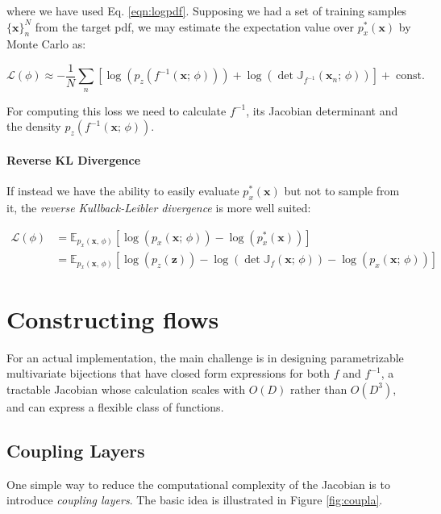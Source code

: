 where we have used Eq. \ref{eqn:logpdf}. Supposing we had a set of training samples $\{\mathbf{x}\}^N_n$ from the target pdf, we may estimate the expectation value over $p_x^*(\mathbf{x})$ by Monte Carlo as:

\[
\mathcal{L}(\phi) \approx -\frac{1}{N} \sum_n [\log(p_z(f^{-1}(\mathbf{x}; \, \phi)))+\log\left(\det\mathbb{J}_{f^{-1}}(\mathbf{x}_n; \, \phi)\right)] +\; \text{const.}
\]

For computing this loss we need to calculate $f^{-1}$, its Jacobian determinant and the density $p_z(f^{-1}(\mathbf{x}; \, \phi))$. 

\paragraph{Reverse KL Divergence} If instead we have the ability to easily evaluate $p_x^*(\mathbf{x})$ but not to sample from it, the \emph{reverse Kullback-Leibler divergence} is more well suited:

\[
\begin{aligned}
    \mathcal{L}(\phi) &= \mathbb{E}_{p_x(\mathbf{x}, \, \phi)}[\log(p_x(\mathbf{x}; \, \phi)) - \log(p_x^*(\mathbf{x}))]\\
    &= \mathbb{E}_{p_x(\mathbf{x}, \, \phi)}[\log(p_z(\mathbf{z}))-\log\left(\det\mathbb{J}_{f}(\mathbf{x}; \, \phi)\right)-\log(p_x(\mathbf{x}; \, \phi))]
\end{aligned}
\]

\section{Constructing flows}
For an actual implementation, the main challenge is in designing parametrizable multivariate bijections that have closed form expressions for both $f$ and $f^{-1}$, a tractable Jacobian whose calculation scales with $O(D)$ rather than $O(D^3)$, and can express a flexible class of functions.

\subsection{Coupling Layers}

One simple way to reduce the computational complexity of the Jacobian is to introduce \emph{coupling layers}. The basic idea is illustrated in Figure \ref{fig:coupla}.

